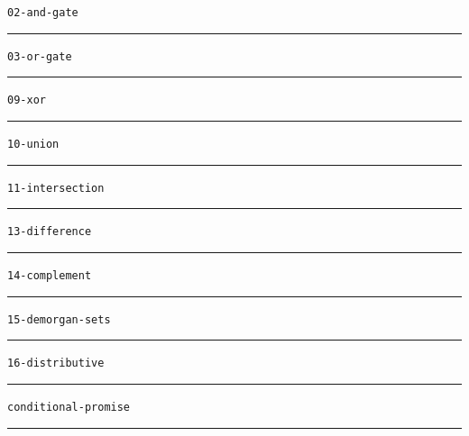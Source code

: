 \documentclass[11pt]{article}
\begin{document}
\thispagestyle{empty}
\def\fig#1#2{\par\bigskip\noindent\texttt{#1}\par\medskip
  \begin{center}\end{center}\hrule}

\fig{02-and-gate}{02-and-gate-circuit}
\fig{03-or-gate}{03-or-gate-circuit}
\fig{09-xor}{09-xor-logic}
\fig{10-union}{10-venn-union}
\fig{11-intersection}{11-venn-intersection}
\fig{13-difference}{13-venn-set-difference}
\fig{14-complement}{14-venn-complement}
\fig{15-demorgan-sets}{15-de-morgan-laws}
\fig{16-distributive}{16-distributive-law-sets}
\fig{conditional-promise}{05-conditional-promise}
\end{document}
